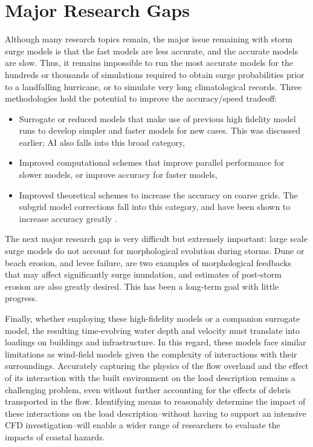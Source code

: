 \section{Major Research Gaps}
\label{sec:storm_surge_gaps}

Although many research topics remain, the major issue remaining with storm surge models is that the fast models are less accurate, and the accurate models are slow. Thus, it remains impossible to run the most accurate models for the hundreds or thousands of simulations required to obtain surge probabilities prior to a landfalling hurricane, or to simulate very long climatological records. Three methodologies hold the potential to improve the accuracy/speed tradeoff:

\begin{itemize}
    \item Surrogate or reduced models that make use of previous high fidelity model runs to develop simpler and faster models for new cases. This was discussed earlier; AI also falls into this broad category,
    \item Improved computational schemes that improve parallel performance for slower models, or improve accuracy for faster models,
    \item Improved theoretical schemes to increase the accuracy on coarse grids. The subgrid model corrections fall into this category, and have been shown to increase accuracy greatly \citep{kennedy2019subgrid}.
\end{itemize}

The next major research gap is very difficult but extremely important: large scale surge models do not account for morphological evolution during storms. Dune or beach erosion, and levee failure, are two examples of morphological feedbacks that may affect significantly surge inundation, and estimates of post-storm erosion are also greatly desired. This has been a long-term goal with little progress.

Finally, whether employing these high-fidelity models or a companion surrogate model, the resulting time-evolving water depth and velocity must translate into loadings on buildings and infrastructure. In this regard, these models face similar limitations as wind-field models given the complexity of interactions with their surroundings. Accurately capturing the physics of the flow overland and the effect of its interaction with the built environment on the load description remains a challenging problem, even without further accounting for the effects of debris transported in the flow. Identifying means to reasonably determine the impact of these interactions on the load description--without having to support an intensive CFD investigation--will enable a wider range of researchers to evaluate the impacts of coastal hazards. 


